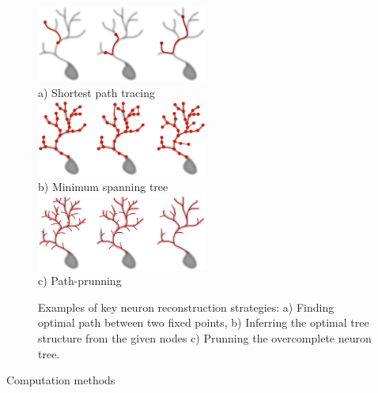 \begin{figure}
\begin{center}
\includegraphics[width=0.5\textwidth]{ch1_fig2}\\
a) Shortest path tracing \\
\includegraphics[width=0.5\textwidth]{ch1_fig3}\\
b) Minimum spanning tree \\
\includegraphics[width=0.5\textwidth]{ch1_fig4}\\
c) Path-prunning
\end{center}
\vspace{-3ex}
\caption{Examples of key neuron reconstruction strategies: a) Finding optimal path between two fixed points, b) Inferring the  optimal tree structure from the given nodes c) Prunning the overcomplete neuron tree.}
\vspace{-1ex}
\label{ch1__fig2-4}
\end{figure}

Computation methods
%
